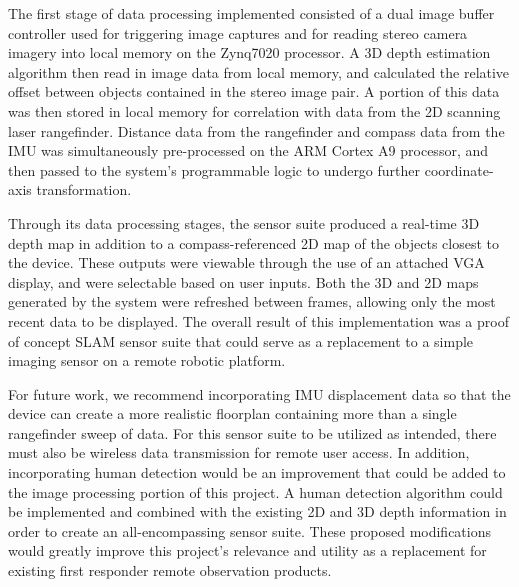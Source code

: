 \par
The first stage of data processing implemented consisted of a dual image buffer controller used for triggering image captures and for reading stereo camera imagery into local memory on the Zynq7020 processor. A 3D depth estimation algorithm then read in image data from local memory, and calculated the relative offset between objects contained in the stereo image pair. A portion of this data was then stored in local memory for correlation with data from the 2D scanning laser rangefinder. Distance data from the rangefinder and compass data from the IMU was simultaneously pre-processed on the ARM Cortex A9 processor, and then passed to the system's programmable logic to undergo further coordinate-axis transformation. 
\par
Through its data processing stages, the sensor suite produced a real-time 3D depth map in addition to a compass-referenced 2D map of the objects closest to the device. These outputs were viewable through the use of an attached VGA display, and were selectable based on user inputs. Both the 3D and 2D maps generated by the system were refreshed between frames, allowing only the most recent data to be displayed. The overall result of this implementation was a proof of concept SLAM sensor suite that could serve as a replacement to a simple imaging sensor on a remote robotic platform.
\par
For future work, we recommend incorporating IMU displacement data so that the device can create a more realistic floorplan containing more than a single rangefinder sweep of data. For this sensor suite to be utilized as intended, there must also be wireless data transmission for remote user access. In addition, incorporating human detection would be an improvement that could be added to the image processing portion of this project. A human detection algorithm could be implemented and combined with the existing 2D and 3D depth information in order to create an all-encompassing sensor suite. These proposed modifications would greatly improve this project's relevance and utility as a replacement for existing first responder remote observation products.





